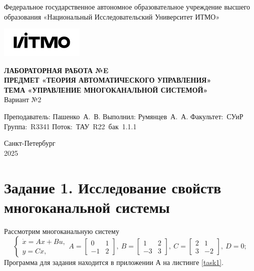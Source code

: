 \documentclass[a4paper, 12pt]{article}
\begin{document}
    \begin{titlepage}

        \begin{center}
        Федеральное государственное автономное образовательное учреждение высшего образования
        «Национальный Исследовательский Университет ИТМО»
        \vfill
        
        \includegraphics[width=0.3\textwidth]{itmo.png} %

        {\large\bf ЛАБОРАТОРНАЯ РАБОТА №E}\\
        {\large\bf ПРЕДМЕТ «ТЕОРИЯ АВТОМАТИЧЕСКОГО УПРАВЛЕНИЯ»}\\
        {\large\bf ТЕМА «УПРАВЛЕНИЕ МНОГОКАНАЛЬНОЙ СИСТЕМОЙ»}\\
        Вариант №2
        \vfill

        \begin{flushright}
            \begin{minipage}{.45\textwidth}
            {
                \hbox{Преподаватель:}
                \hbox{Пашенко А. В.}
                \hbox{}
                \hbox{Выполнил:}
                \hbox{Румянцев А. А.}
                \hbox{}
                \hbox{Факультет: СУиР}
                \hbox{Группа: R3341}
                \hbox{Поток: ТАУ R22 бак 1.1.1}
            }
            \end{minipage}
        \end{flushright}
        \vfill
  
        Санкт-Петербург\\
        2025
        \end{center}
    \end{titlepage}
    
    \tableofcontents

    \newpage
    \section{Задание 1. Исследование свойств многоканальной системы}
    Рассмотрим многоканальную систему
    $$
    \begin{cases}
    \dot{x}=Ax+Bu,\\
    y=Cx,
    \end{cases} A=\begin{bmatrix}
        0 &1\\
        -1 &2
    \end{bmatrix},\ B=\begin{bmatrix}
        1 &2\\
        -3 &3
    \end{bmatrix},\ C=\begin{bmatrix}
        2 &1\\
        3 &-2
    \end{bmatrix},\ D=0;
    $$
    Программа для задания находится в приложении А на листинге \ref{task1}.
\end{document}
